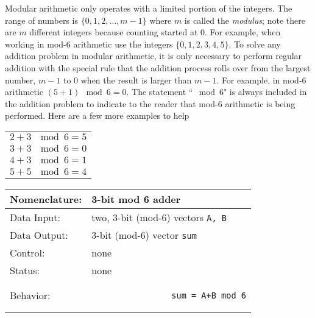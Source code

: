\begin{enumerate}
            \label{page:mod}
            Modular arithmetic only operates with a limited portion of the
            integers.  The range of numbers is $\{0,1,2, \ldots ,m-1\}$ where
            $m$ is called the \textit{ modulus}; note there are $m$ different
            integers because counting started at 0.  For example, when working
            in mod-6 arithmetic use the integers $\{0,1,2,3,4,5\}$.
            To solve any addition problem in modular arithmetic, it is only
            necessary to perform regular addition with the special rule that
            the addition process rolls over from the largest number, $m-1$ to 0
            when the result is larger than $m-1$.  For
            example, in mod-6 arithmetic $(5+1) \mod 6 = 0$.  The statement
            ``$\mod 6$" is always included in the addition problem to indicate
            to the reader that mod-6 arithmetic is being performed.  Here
            are a few more examples to help

            \begin{tabular}{l}
                $2+3~\mod 6 = 5$ \\
                $3+3~\mod 6 = 0$ \\
                $4+3~\mod 6 = 1$ \\
                $5+5~\mod 6 = 4$
            \end{tabular}

            \label{page:modadder}
            \begin{tabular}{|l|p{3.5in}|} \hline
                Nomenclature:  & 3-bit mod 6 adder                \\ \hline
                Data Input:    & two, 3-bit (mod-6) vectors \verb+A, B+  \\ \hline
                Data Output:   & 3-bit (mod-6) vector \verb+sum+    \\ \hline
                Control:       & none                                   \\ \hline
                Status:        & none                                   \\ \hline
                Behavior:      &
                \begin{verbatim}
                sum = A+B mod 6
                \end{verbatim}
                \\ \hline
            \end{tabular}


\end{enumerate}

